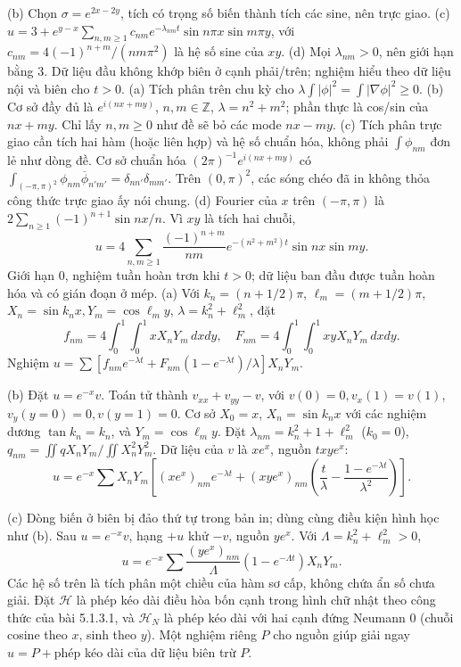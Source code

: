 (b) Chọn $\sigma=e^{2x-2y}$, tích có trọng số biến thành tích các sine, nên trực giao.
(c) $u=3+e^{y-x}\sum_{n,m\ge1}c_{nm}e^{-\lambda_{nm}t}\sin n\pi x\sin m\pi y$, với $c_{nm}=4(-1)^{n+m}/(nm\pi^2)$ là hệ số sine của $xy$.
(d) Mọi $\lambda_{nm}>0$, nên giới hạn bằng 3. Dữ liệu đầu không khớp biên ở cạnh phải/trên; nghiệm hiểu theo dữ liệu nội và biên cho $t>0$.
(a) Tích phân trên chu kỳ cho $\lambda\int|\phi|^2=\int|\nabla\phi|^2\ge0$.
(b) Cơ sở đầy đủ là $e^{i(nx+my)}$, $n,m\in\mathbb Z$, $\lambda=n^2+m^2$; phần thực là cos/sin của $nx+my$. Chỉ lấy $n,m\ge0$ như đề sẽ bỏ các mode $nx-my$.
(c) Tích phân trực giao cần tích hai hàm (hoặc liên hợp) và hệ số chuẩn hóa, không phải $\int\phi_{nm}$ đơn lẻ như dòng đề. Cơ sở chuẩn hóa $(2\pi)^{-1}e^{i(nx+my)}$ có $\int_{(-\pi,\pi)^2}\phi_{nm}\overline\phi_{n'm'}=\delta_{nn'}\delta_{mm'}$. Trên $(0,\pi)^2$, các sóng chéo đã in không thỏa công thức trực giao ấy nói chung.
(d) Fourier của $x$ trên $(-\pi,\pi)$ là $2\sum_{n\ge1}(-1)^{n+1}\sin nx/n$. Vì $xy$ là tích hai chuỗi,
\[u=4\sum_{n,m\ge1}\frac{(-1)^{n+m}}{nm}e^{-(n^2+m^2)t}\sin nx\sin my.\]
Giới hạn 0, nghiệm tuần hoàn trơn khi $t>0$; dữ liệu ban đầu được tuần hoàn hóa và có gián đoạn ở mép.
(a) Với $k_n=(n+1/2)\pi$, $\ell_m=(m+1/2)\pi$, $X_n=\sin k_nx,Y_m=\cos\ell_my$, $\lambda=k_n^2+\ell_m^2$, đặt
\[f_{nm}=4\int_0^1\int_0^1xX_nY_m\,dxdy,\quad F_{nm}=4\int_0^1\int_0^1xyX_nY_m\,dxdy.\]
Nghiệm $u=\sum[f_{nm}e^{-\lambda t}+F_{nm}(1-e^{-\lambda t})/\lambda]X_nY_m$.

(b) Đặt $u=e^{-x}v$. Toán tử thành $v_{xx}+v_{yy}-v$, với $v(0)=0,v_x(1)=v(1)$, $v_y(y=0)=0,v(y=1)=0$. Cơ sở $X_0=x$, $X_n=\sin k_nx$ với các nghiệm dương $\tan k_n=k_n$, và $Y_m=\cos\ell_my$. Đặt $\lambda_{nm}=k_n^2+1+\ell_m^2$ ($k_0=0$), $q_{nm}=\iint qX_nY_m/\iint X_n^2Y_m^2$. Dữ liệu của $v$ là $xe^x$, nguồn $txy e^x$:
\[u=e^{-x}\sum X_nY_m\left[(xe^x)_{nm}e^{-\lambda t}+(xy e^x)_{nm}\left(\frac t\lambda-\frac{1-e^{-\lambda t}}{\lambda^2}\right)\right].\]

(c) Dòng biến ở biên bị đảo thứ tự trong bản in; dùng cùng điều kiện hình học như (b). Sau $u=e^{-x}v$, hạng $+u$ khử $-v$, nguồn $ye^x$. Với $\Lambda=k_n^2+\ell_m^2>0$,
\[u=e^{-x}\sum\frac{(ye^x)_{nm}}\Lambda(1-e^{-\Lambda t})X_nY_m.\]
Các hệ số trên là tích phân một chiều của hàm sơ cấp, không chứa ẩn số chưa giải.
Đặt $\mathcal H$ là phép kéo dài điều hòa bốn cạnh trong hình chữ nhật theo công thức của bài 5.1.3.1, và $\mathcal H_N$ là phép kéo dài với hai cạnh đứng Neumann 0 (chuỗi cosine theo $x$, sinh theo $y$). Một nghiệm riêng $P$ cho nguồn giúp giải ngay $u=P+$phép kéo dài của dữ liệu biên trừ $P$.

